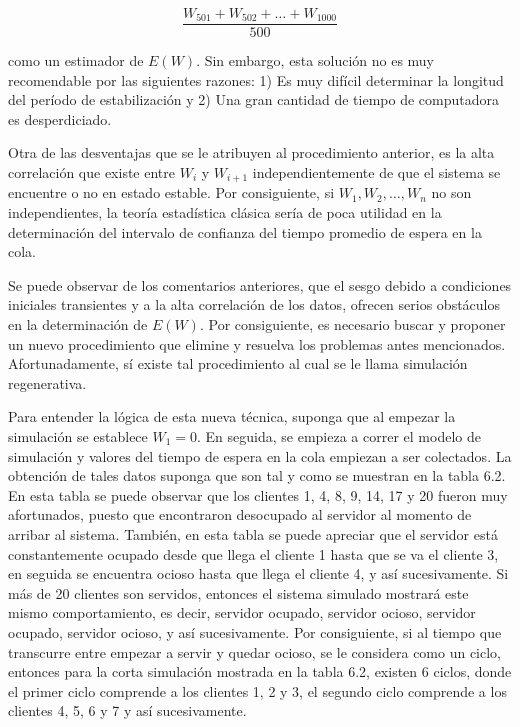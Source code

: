 \documentclass[11pt,letterpaper]{report}
\begin{document}
\begin{equation}
\frac{W_{501} + W_{502} + \ldots + W_{1000}}{500}
\end{equation}

como un estimador de $E(W)$. Sin embargo, esta solución no es muy
recomendable por las siguientes razones: 1) Es muy difícil determinar la
longitud del período de estabilización y 2) Una gran cantidad de tiempo
de computadora es desperdiciado.

Otra de las desventajas que se le atribuyen al procedimiento anterior,
es la alta correlación que existe entre $W_i$ y $W_{i+1}$
independientemente de que el sistema se encuentre o no en estado
estable. Por consiguiente, si $W_1, W_2, \ldots, W_n$ no son
independientes, la teoría estadística clásica sería de poca utilidad en
la determinación del intervalo de confianza del tiempo promedio de
espera en la cola.

Se puede observar de los comentarios anteriores, que el sesgo debido a
condiciones iniciales transientes y a la alta correlación de los datos,
ofrecen serios obstáculos en la determinación de $E(W)$. Por
consiguiente, es necesario buscar y proponer un nuevo procedimiento que
elimine y resuelva los problemas antes mencionados. Afortunadamente, sí
existe tal procedimiento al cual se le llama simulación regenerativa.

Para entender la lógica de esta nueva técnica, suponga que al empezar la
simulación se establece $W_1=0$. En seguida, se empieza a correr el
modelo de simulación y valores del tiempo de espera en la cola empiezan
a ser colectados. La obtención de tales datos suponga que son tal y como
se muestran en la tabla 6.2. En esta tabla se puede observar que los
clientes 1, 4, 8, 9, 14, 17 y 20 fueron muy afortunados, puesto que
encontraron desocupado al servidor al momento de arribar al sistema.
También, en esta tabla se puede apreciar que el servidor está
constantemente ocupado desde que llega el cliente 1 hasta que se va el
cliente 3, en seguida se encuentra ocioso hasta que llega el cliente 4,
y así sucesivamente. Si más de 20 clientes son servidos, entonces el
sistema simulado mostrará este mismo comportamiento, es decir, servidor
ocupado, servidor ocioso, servidor ocupado, servidor ocioso, y así
sucesivamente. Por consiguiente, si al tiempo que transcurre entre
empezar a servir y quedar ocioso, se le considera como un ciclo,
entonces para la corta simulación mostrada en la tabla 6.2, existen 6
ciclos, donde el primer ciclo comprende a los clientes 1, 2 y 3, el
segundo ciclo comprende a los clientes 4, 5, 6 y 7 y así sucesivamente.
\end{document}
